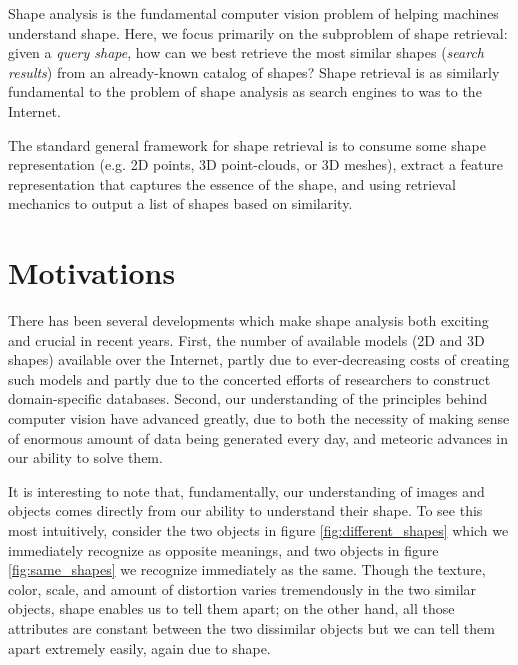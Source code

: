 \documentclass[../tech_report_1.tex]{subfiles}
\begin{document}
Shape analysis is the fundamental computer vision problem of helping machines understand shape. Here, we focus primarily on the subproblem of shape retrieval: given a \textit{query shape}, how can we best retrieve the most similar shapes (\textit{search results}) from an already-known catalog of shapes? Shape retrieval is as similarly fundamental to the problem of shape analysis as search engines to was to the Internet.

The standard general framework for shape retrieval is to consume some shape representation (e.g. 2D points, 3D point-clouds, or 3D meshes), extract a feature representation that captures the essence of the shape, and using retrieval mechanics to output a list of shapes based on similarity.

\section{Motivations}

There has been several developments which make shape analysis both exciting and crucial in recent years. First, the number of available models (2D and 3D shapes) available over the Internet, partly due to ever-decreasing costs of creating such models and partly due to the concerted efforts of researchers to construct domain-specific databases. Second, our understanding of the principles behind computer vision have advanced greatly, due to both the necessity of making sense of enormous amount of data being generated every day\cite{manyika2011big}, and meteoric advances in our ability to solve them\cite{krizhevsky2012imagenet}.

It is interesting to note that, fundamentally, our understanding of images and objects comes directly from our ability to understand their shape. To see this most intuitively, consider the two objects in figure \ref{fig:different_shapes} which we immediately recognize as opposite meanings, and two objects in figure \ref{fig:same_shapes} we recognize immediately as the same. Though the texture, color, scale, and amount of distortion varies tremendously in the two similar objects, shape enables us to tell them apart; on the other hand, all those attributes are constant between the two dissimilar objects but we can tell them apart extremely easily, again due to shape.
\end{document}

